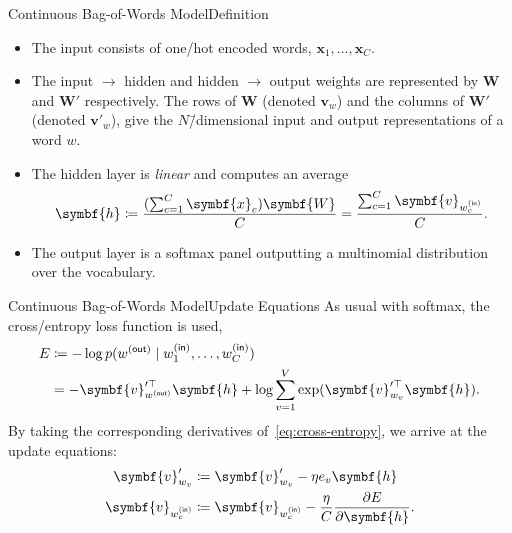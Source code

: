 \documentclass[usepdftitle=false]{beamer}
\theoremstyle{definition}
\renewcommand*{\vec}{\symbf}%
\newcommand*{\mat}{\symbf}%
\newcommand*{\trans}{\top}%
\newcommand*{\ins}{\mathsf{(in)}}
\newcommand*{\outs}{\mathsf{(out)}}
\begin{document}
\begin{frame}{Continuous Bag-of-Words Model}{Definition}
  \begin{itemize}
  \item The input consists of one\-/hot encoded words,
    \(\vec{x}_1, \ldots, \vec{x}_C\).
  \item The input \(\to\) hidden and hidden \(\to\) output weights are
    represented by \(\mat{W}\) and \(\mat{W}'\) respectively.  The
    rows of \(\mat{W}\) (denoted \(\vec{v}_w\)) and the columns of
    \(\mat{W}'\) (denoted \(\vec{v}'_w\)), give the
    \alert{\(N\)\=/dimensional input} and \alert{output
      representations} of a word \(w\).
  \item The hidden layer is \emph{linear} and computes an average
    \[
      \vec{h} \coloneqq \frac{(\sum_{c = 1}^{C} \vec{x}_c) \mat{W}}{C}
      = \frac{\sum_{c = 1}^{C} \vec{v}_{w^{\ins}_c}}{C}\text.
    \]
  \item The output layer is a softmax panel outputting a multinomial
    distribution over the vocabulary.
  \end{itemize}
\end{frame}

\begin{frame}{Continuous Bag-of-Words Model}{Update Equations}
  As usual with softmax, the cross\-/entropy loss function is used,
  \begin{equation}\label{eq:cross-entropy}
    \begin{aligned}
      E &\coloneqq -\log p(w^{\outs} \mid w^{\ins}_1, \ldots, w^{\ins}_C)\\
      &= -\vec{v}_{w^{\outs}}^{\prime\trans} \vec{h} + \log \sum_{v =
        1}^{V} \exp(\vec{v}_{w_v}^{\prime\trans} \vec{h})\text.
    \end{aligned}
  \end{equation}
  By taking the corresponding derivatives of~\eqref{eq:cross-entropy},
  we arrive at the update equations:
  \begin{equation}\label{eq:update-equations}
    \begin{aligned}
      \vec{v}'_{w_v}&\coloneqq \vec{v}'_{w_v} - \eta e_v \vec{h}\\
      \vec{v}_{w^{\ins}_c} &\coloneqq \vec{v}_{w^{\ins}_c} -
      \frac{\eta}{C} \frac{\partial E}{\partial \vec{h}}\text.
    \end{aligned}
  \end{equation}
\end{frame}
\end{document}
